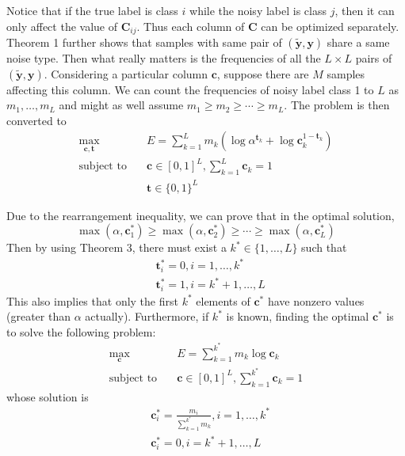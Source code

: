 \documentclass[10pt,twocolumn,letterpaper]{article}
\def\vec{\mathbf}
\def\mat{\mathbf}
\begin{document}
Notice that if the true label is class $i$ while the noisy label is class $j$, then it can only affect the value of $\mat{C}_{ij}$. Thus each column of $\mat{C}$ can be optimized separately. Theorem 1 further shows that samples with same pair of $(\tilde{\vec{y}},\vec{y})$ share a same noise type. Then what really matters is the frequencies of all the $L\times L$ pairs of $(\tilde{\vec{y}},\vec{y})$. Considering a particular column $\vec{c}$, suppose there are $M$ samples affecting this column. We can count the frequencies of noisy label class 1 to $L$ as $m_1,\dots,m_L$ and might as well assume $m_1\geq m_2\geq \cdots \geq m_L$. The problem is then converted to
\begin{equation}
\begin{aligned}
\max_{\vec{c},\vec{t}} \quad & E=\sum_{k=1}^{L} m_k \left(\log \alpha^{\vec{t}_k} + \log \mat{c}_k^{1-\vec{t}_k}\right)\\
\text{subject to} \quad & \vec{c} \in [0,1]^L, \sum_{k=1}^{L} \vec{c}_k = 1 \\
                    & \vec{t} \in \{0,1\}^{L}
\end{aligned}
\end{equation}

Due to the rearrangement inequality, we can prove that in the optimal solution,
\begin{equation}
    \max(\alpha,\vec{c}^*_1) \geq \max(\alpha,\vec{c}^*_2) \geq \cdots \geq \max(\alpha,\vec{c}^*_L)
\end{equation}
Then by using Theorem 3, there must exist a $k^* \in \{1,\dots,L\}$ such that
\begin{equation} \label{eq:opt_t}
\begin{aligned}
    &\vec{t}^*_i = 0, i = 1,\dots,k^* \\
    &\vec{t}^*_i = 1, i = k^*+1,\dots,L
\end{aligned}
\end{equation}
This also implies that only the first $k^*$ elements of $\vec{c}^*$ have nonzero values (greater than $\alpha$ actually). Furthermore, if $k^*$ is known, finding the optimal $\vec{c}^*$ is to solve the following problem:
\begin{equation}
\begin{aligned}
\max_{\vec{c}} \quad & E=\sum_{k=1}^{k^*} m_k \log \mat{c}_k\\
\text{subject to} \quad & \vec{c} \in [0,1]^L, \sum_{k=1}^{k^*} \vec{c}_k = 1
\end{aligned}
\end{equation}
whose solution is
\begin{equation} \label{eq:opt_c}
\begin{aligned}
    &\vec{c}^*_i = \frac{m_i}{\sum_{k=1}^{k^*}{m_k}}, i = 1,\dots,k^* \\
    &\vec{c}^*_i = 0, i = k^*+1,\dots,L
\end{aligned}
\end{equation}
\end{document}
